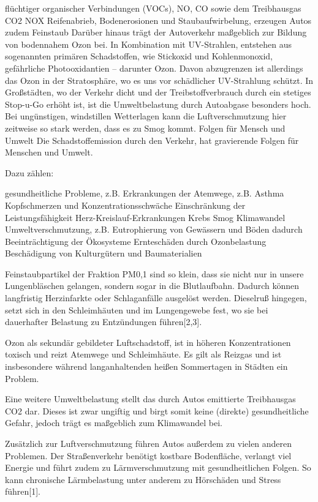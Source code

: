 flüchtiger organischer Verbindungen (VOCs), \ac{NO}, \ac{CO} sowie dem Treibhausgas \ac{CO2} \ac{NOX}
Reifenabrieb, Bodenerosionen und Staubaufwirbelung, erzeugen Autos zudem Feinstaub
Darüber hinaus trägt der Autoverkehr maßgeblich zur Bildung von bodennahem Ozon bei. In Kombination mit UV-Strahlen, entstehen aus sogenannten primären Schadstoffen, wie Stickoxid und Kohlenmonoxid, gefährliche Photooxidantien – darunter Ozon. Davon abzugrenzen ist allerdings das Ozon in der Stratosphäre, wo es uns vor schädlicher UV-Strahlung schützt.
In Großstädten, wo der Verkehr dicht und der Treibstoffverbrauch durch ein stetiges Stop-u-Go erhöht ist, ist die Umweltbelastung durch Autoabgase besonders hoch. Bei ungünstigen, windstillen Wetterlagen kann die Luftverschmutzung hier zeitweise so stark werden, dass es zu Smog kommt.
Folgen für Mensch und Umwelt
Die Schadstoffemission durch den Verkehr, hat gravierende Folgen für Menschen und Umwelt.

Dazu zählen:

gesundheitliche Probleme, z.B.
Erkrankungen der Atemwege, z.B. Asthma
Kopfschmerzen und Konzentrationsschwäche
Einschränkung der Leistungsfähigkeit
Herz-Kreislauf-Erkrankungen
Krebs
Smog
Klimawandel
Umweltverschmutzung, z.B. Eutrophierung von Gewässern und Böden
dadurch Beeinträchtigung der Ökosysteme
Ernteschäden durch Ozonbelastung
Beschädigung von Kulturgütern und Baumaterialien


Feinstaubpartikel der Fraktion PM0,1 sind so klein, dass sie nicht nur in unsere Lungenbläschen gelangen, sondern sogar in die Blutlaufbahn. Dadurch können langfristig Herzinfarkte oder Schlaganfälle ausgelöst werden. Dieselruß hingegen, setzt sich in den Schleimhäuten und im Lungengewebe fest, wo sie bei dauerhafter Belastung zu Entzündungen führen[2,3].

Ozon als sekundär gebildeter Luftschadstoff, ist in höheren Konzentrationen toxisch und reizt Atemwege und Schleimhäute. Es gilt als Reizgas und ist insbesondere während langanhaltenden heißen Sommertagen in Städten ein Problem.



Eine weitere Umweltbelastung stellt das durch Autos emittierte Treibhausgas CO2 dar. Dieses ist zwar ungiftig und birgt somit keine (direkte) gesundheitliche Gefahr, jedoch trägt es maßgeblich zum Klimawandel bei.

Zusätzlich zur Luftverschmutzung führen Autos außerdem zu vielen anderen Problemen. Der Straßenverkehr benötigt kostbare Bodenfläche, verlangt viel Energie und führt zudem zu Lärmverschmutzung mit gesundheitlichen Folgen. So kann chronische Lärmbelastung unter anderem zu Hörschäden und Stress führen[1].

